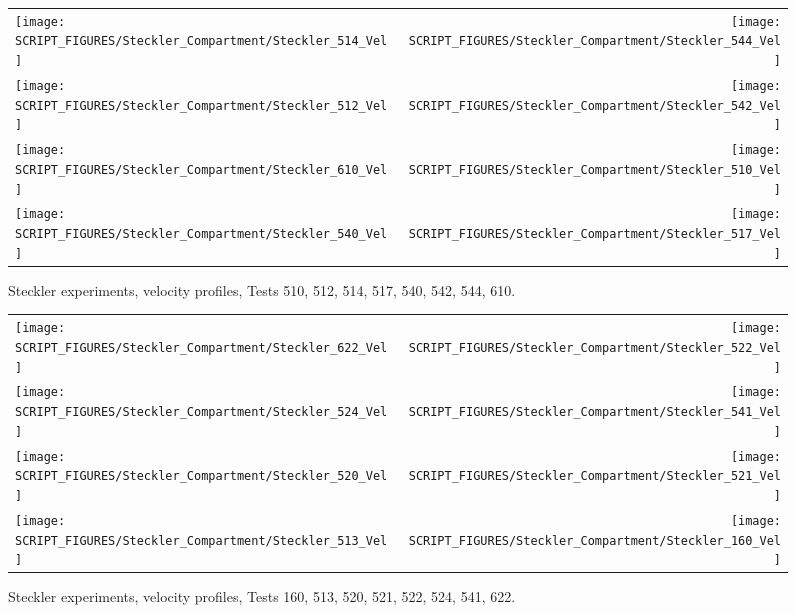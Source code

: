 \begin{figure}[p]
\begin{tabular*}{\textwidth}{l@{\extracolsep{\fill}}r}
\texttt{[image: SCRIPT\_FIGURES/Steckler\_Compartment/Steckler\_514\_Vel]} &
\texttt{[image: SCRIPT\_FIGURES/Steckler\_Compartment/Steckler\_544\_Vel]} \\
\texttt{[image: SCRIPT\_FIGURES/Steckler\_Compartment/Steckler\_512\_Vel]} &
\texttt{[image: SCRIPT\_FIGURES/Steckler\_Compartment/Steckler\_542\_Vel]} \\
\texttt{[image: SCRIPT\_FIGURES/Steckler\_Compartment/Steckler\_610\_Vel]} &
\texttt{[image: SCRIPT\_FIGURES/Steckler\_Compartment/Steckler\_510\_Vel]} \\
\texttt{[image: SCRIPT\_FIGURES/Steckler\_Compartment/Steckler\_540\_Vel]} &
\texttt{[image: SCRIPT\_FIGURES/Steckler\_Compartment/Steckler\_517\_Vel]}
\end{tabular*}
\caption[Steckler experiments, velocity profiles, Tests 510, 512, 514, 517, 540, 542, 544, 610]{Steckler experiments, velocity profiles, Tests 510, 512, 514, 517, 540, 542, 544, 610.}
\label{Steckler_Vel_5}
\end{figure}

\begin{figure}[p]
\begin{tabular*}{\textwidth}{l@{\extracolsep{\fill}}r}
\texttt{[image: SCRIPT\_FIGURES/Steckler\_Compartment/Steckler\_622\_Vel]} &
\texttt{[image: SCRIPT\_FIGURES/Steckler\_Compartment/Steckler\_522\_Vel]} \\
\texttt{[image: SCRIPT\_FIGURES/Steckler\_Compartment/Steckler\_524\_Vel]} &
\texttt{[image: SCRIPT\_FIGURES/Steckler\_Compartment/Steckler\_541\_Vel]} \\
\texttt{[image: SCRIPT\_FIGURES/Steckler\_Compartment/Steckler\_520\_Vel]} &
\texttt{[image: SCRIPT\_FIGURES/Steckler\_Compartment/Steckler\_521\_Vel]} \\
\texttt{[image: SCRIPT\_FIGURES/Steckler\_Compartment/Steckler\_513\_Vel]} &
\texttt{[image: SCRIPT\_FIGURES/Steckler\_Compartment/Steckler\_160\_Vel]}
\end{tabular*}
\caption[Steckler experiments, velocity profiles, Tests 160, 513, 520, 521, 522, 524, 541, 622]{Steckler experiments, velocity profiles, Tests 160, 513, 520, 521, 522, 524, 541, 622.}
\label{Steckler_Vel_6}
\end{figure}

